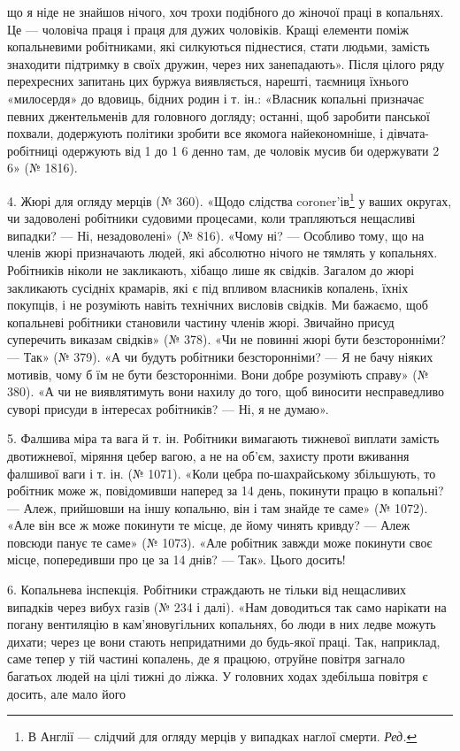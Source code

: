 \parcont{}  %
що я ніде не знайшов нічого, хоч трохи подібного до жіночої
праці в копальнях. Це — чоловіча праця і праця для дужих
чоловіків. Кращі елементи поміж копальневими робітниками,
які силкуються піднестися, стати людьми, замість знаходити підтримку
в своїх дружин, через них занепадають». Після цілого
ряду перехресних запитань цих буржуа виявляється, нарешті,
таємниця їхнього «милосердя» до вдовиць, бідних родин і т. ін.:
«Власник копальні призначає певних джентельменів для головного
догляду; останні, щоб заробити панської похвали, додержують
політики зробити все якомога найекономніше, і дівчата-робітниці
одержують від 1 до 1 6 денно там,
де чоловік мусив би одержувати 2 6» (№ 1816).

4. Жюрі для огляду мерців (№ 360). «Щодо слідства coroner’ів\footnote*{
В Англії — слідчий для огляду мерців у випадках наглої смерти. \emph{Ред.}
}
у ваших округах, чи задоволені робітники судовими процесами,
коли трапляються нещасливі випадки? — Ні, незадоволені»
(№ 816). «Чому ні? — Особливо тому, що на членів жюрі призначають
людей, які абсолютно нічого не тямлять у копальнях. Робітників
ніколи не закликають, хібащо лише як свідків. Загалом
до жюрі закликають сусідніх крамарів, які є під впливом власників
копалень, їхніх покупців, і не розуміють навіть технічних
висловів свідків. Ми бажаємо, щоб копальневі робітники становили
частину членів жюрі. Звичайно присуд суперечить виказам
свідків» (№ 378). «Чи не повинні жюрі бути безсторонніми? —
Так» (№ 379). «А чи будуть робітники безсторонніми? — Я не
бачу ніяких мотивів, чому б їм не бути безсторонніми. Вони
добре розуміють справу» (№ 380). «А чи не виявлятимуть вони
нахилу до того, щоб виносити несправедливо суворі присуди в
інтересах робітників? — Ні, я не думаю».

5. Фалшива міра та вага й т. ін. Робітники вимагають тижневої
виплати замість двотижневої, міряння цебер вагою, а не
на об’єм, захисту проти вживання фалшивої ваги і т. ін.
(№ 1071). «Коли цебра по-шахрайському збільшують, то робітник
може ж, повідомивши наперед за 14 день, покинути працю
в копальні? — Алеж, прийшовши на іншу копальню, він і там
знайде те саме» (№ 1072). «Але він все ж може покинути те місце,
де йому чинять кривду? — Алеж повсюди панує те саме» (№ 1073).
«Але робітник завжди може покинути своє місце, попередивши
про це за 14 днів? — Так». Цього досить!

6. Копальнева інспекція. Робітники страждають не тільки
від нещасливих випадків через вибух газів (№ 234 і далі). «Нам
доводиться так само нарікати на погану вентиляцію в кам’яновугільних
копальнях, бо люди в них ледве можуть дихати;
через це вони стають непридатними до будь-якої праці. Так,
наприклад, саме тепер у тій частині копалень, де я працюю,
отруйне повітря загнало багатьох людей на цілі тижні до ліжка.
У головних ходах здебільша повітря є досить, але мало його
\parbreak{}  %
